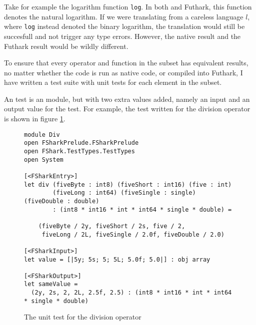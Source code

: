 Take for example the logarithm function \texttt{log}. In both \fsharp{} and
Futhark, this function denotes the natural logarithm. If we were translating
from a careless language $l$, where \texttt{log} instead denoted the binary
logarithm, the translation would still be succesfull and not trigger any type
errors.
However, the native result and the Futhark result would be wildly different.

To ensure that every operator and function in the \fshark{} subset has
equivalent results, no matter whether the \fshark{} code is run as native
\fsharp{} code, or compiled into Futhark, I have written a test suite with unit
tests for each element in the \fsharp{} subset. 

An \fshark{} test is an \fshark{} module, but with two extra values added,
namely an input and an output value for the test. For example, the test written for the
division operator is shown in figure \ref{fig:fsharkdivtest}.

\begin{figure}[h]
  \centering
\begin{verbatim}
module Div
open FSharkPrelude.FSharkPrelude
open FShark.TestTypes.TestTypes
open System

[<FSharkEntry>]
let div (fiveByte : int8) (fiveShort : int16) (five : int) 
        (fiveLong : int64) (fiveSingle : single) (fiveDouble : double) 
        : (int8 * int16 * int * int64 * single * double) =

    (fiveByte / 2y, fiveShort / 2s, five / 2, 
     fiveLong / 2L, fiveSingle / 2.0f, fiveDouble / 2.0)

[<FSharkInput>]
let value = [|5y; 5s; 5; 5L; 5.0f; 5.0|] : obj array

[<FSharkOutput>]
let sameValue = 
  (2y, 2s, 2, 2L, 2.5f, 2.5) : (int8 * int16 * int * int64 * single * double)
\end{verbatim}
  \caption{The unit test for the \fshark{} division operator}
  \label{fig:fsharkdivtest}
\end{figure}





